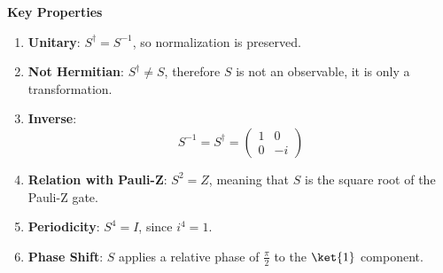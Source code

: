 \begin{flushleft}
    \textcolor{Green3}{ \textbf{Key Properties}}
\end{flushleft}
\begin{enumerate}
    \item \textbf{Unitary}: $S^{\dagger} = S^{-1}$, so normalization is preserved.
    
    \item \textbf{Not Hermitian}: $S^{\dagger} \neq S$, therefore $S$ is not an observable, it is only a transformation.
    
    \item \textbf{Inverse}: 
    \begin{equation*}
        S^{-1} = S^{\dagger} = 
        \begin{pmatrix}
            1 & 0 \\ 0 & -i
        \end{pmatrix}
    \end{equation*}
    
    \item \textbf{Relation with Pauli-Z}: $S^{2} = Z$, meaning that $S$ is the square root of the Pauli-Z gate.
    
    \item \textbf{Periodicity}: $S^{4} = I$, since $i^{4} = 1$.
    
    \item \textbf{Phase Shift}: $S$ applies a relative phase of $\frac{\pi}{2}$ to the $\ket{1}$ component.
\end{enumerate}